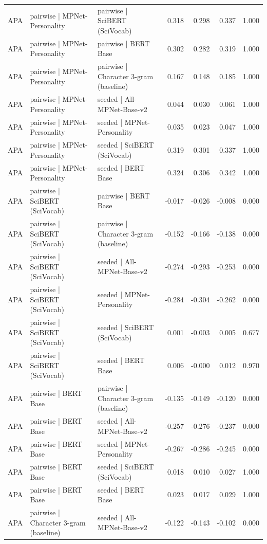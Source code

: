 \begin{table}[ht]
\begin{tabular}{lllrrrr}
APA & pairwise | MPNet-Personality & pairwise | SciBERT (SciVocab) & 0.318 & 0.298 & 0.337 & 1.000 \\
APA & pairwise | MPNet-Personality & pairwise | BERT Base & 0.302 & 0.282 & 0.319 & 1.000 \\
APA & pairwise | MPNet-Personality & pairwise | Character 3-gram (baseline) & 0.167 & 0.148 & 0.185 & 1.000 \\
APA & pairwise | MPNet-Personality & seeded | All-MPNet-Base-v2 & 0.044 & 0.030 & 0.061 & 1.000 \\
APA & pairwise | MPNet-Personality & seeded | MPNet-Personality & 0.035 & 0.023 & 0.047 & 1.000 \\
APA & pairwise | MPNet-Personality & seeded | SciBERT (SciVocab) & 0.319 & 0.301 & 0.337 & 1.000 \\
APA & pairwise | MPNet-Personality & seeded | BERT Base & 0.324 & 0.306 & 0.342 & 1.000 \\
APA & pairwise | SciBERT (SciVocab) & pairwise | BERT Base & -0.017 & -0.026 & -0.008 & 0.000 \\
APA & pairwise | SciBERT (SciVocab) & pairwise | Character 3-gram (baseline) & -0.152 & -0.166 & -0.138 & 0.000 \\
APA & pairwise | SciBERT (SciVocab) & seeded | All-MPNet-Base-v2 & -0.274 & -0.293 & -0.253 & 0.000 \\
APA & pairwise | SciBERT (SciVocab) & seeded | MPNet-Personality & -0.284 & -0.304 & -0.262 & 0.000 \\
APA & pairwise | SciBERT (SciVocab) & seeded | SciBERT (SciVocab) & 0.001 & -0.003 & 0.005 & 0.677 \\
APA & pairwise | SciBERT (SciVocab) & seeded | BERT Base & 0.006 & -0.000 & 0.012 & 0.970 \\
APA & pairwise | BERT Base & pairwise | Character 3-gram (baseline) & -0.135 & -0.149 & -0.120 & 0.000 \\
APA & pairwise | BERT Base & seeded | All-MPNet-Base-v2 & -0.257 & -0.276 & -0.237 & 0.000 \\
APA & pairwise | BERT Base & seeded | MPNet-Personality & -0.267 & -0.286 & -0.245 & 0.000 \\
APA & pairwise | BERT Base & seeded | SciBERT (SciVocab) & 0.018 & 0.010 & 0.027 & 1.000 \\
APA & pairwise | BERT Base & seeded | BERT Base & 0.023 & 0.017 & 0.029 & 1.000 \\
APA & pairwise | Character 3-gram (baseline) & seeded | All-MPNet-Base-v2 & -0.122 & -0.143 & -0.102 & 0.000 \\

\end{tabular}
\end{table}

